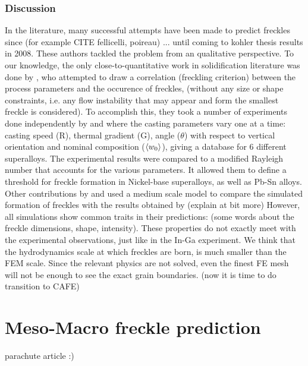 \subsubsection{Discussion}
In the literature, many successful attempts have been made to predict freckles since (for example CITE fellicelli, poireau) ... until coming to kohler thesis results in 2008. These authors tackled the problem from an qualitative perspective. To our knowledge, the only close-to-quantitative work in solidification literature was done by \citet{ramirez_evaluation_2003}, who attempted to draw a correlation (freckling criterion) between the process parameters and the occurence of freckles, (without any size or shape constraints, i.e. any flow instability that may appear and form the smallest freckle is considered). To accomplish this, they took a number of experiments done independently by \citet{pollock_breakdown_1996} and \citet{auburtin_freckle_2000} where the casting parameters vary one at a time: casting speed (R), thermal gradient (G), angle ($\theta$) with respect to vertical orientation and nominal composition ($\langle w_0 \rangle$), giving a database for 6 different superalloys. The experimental results were compared to a modified Rayleigh number that accounts for the various parameters. It allowed them to define a threshold for freckle formation in Nickel-base superalloys, as well as Pb-Sn alloys.
Other contributions by \citet{yuan_new_2012} and  \citet{karagadde_3-d_2014} used a medium scale model to compare the simulated formation of freckles with the results obtained by \citet{shevchenko_chimney_2013} (explain at bit more)
However, all simulations show common traits in their predictions: (some words about the freckle dimensions, shape, intensity). These properties do not exactly meet with the experimental observations, just like in the In-Ga experiment. We think that the hydrodynamics scale 
at which freckles are born, is much smaller than the FEM scale. Since the relevant physics are not solved, even the finest FE mesh will not
be enough to see the exact grain boundaries. (now it is time to do transition to CAFE)



\section{Meso-Macro freckle prediction}

parachute article :)
















